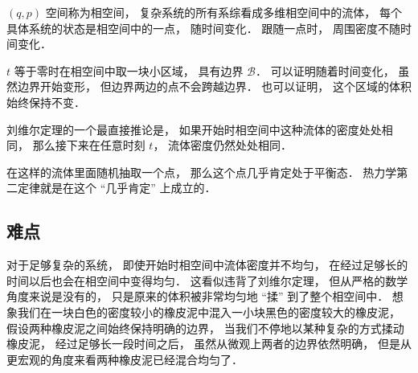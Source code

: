 
\begin{issues}
\issueDraft
\end{issues}

$(q, p)$ 空间称为相空间， 复杂系统的所有系综看成多维相空间中的流体， 每个具体系统的状态是相空间中的一点， 随时间变化． 跟随一点时， 周围密度不随时间变化．

$t$ 等于零时在相空间中取一块小区域， 具有边界 $\mathcal B$． 可以证明随着时间变化， 虽然边界开始变形， 但边界两边的点不会跨越边界． 也可以证明， 这个区域的体积始终保持不变．

刘维尔定理的一个最直接推论是， 如果开始时相空间中这种流体的密度处处相同， 那么接下来在任意时刻 $t$， 流体密度仍然处处相同．

在这样的流体里面随机抽取一个点， 那么这个点几乎肯定处于平衡态． 热力学第二定律就是在这个 “几乎肯定” 上成立的．

\subsection{难点}
对于足够复杂的系统， 即使开始时相空间中流体密度并不均匀， 在经过足够长的时间以后也会在相空间中变得均匀． 这看似违背了刘维尔定理， 但从严格的数学角度来说是没有的， 只是原来的体积被非常均匀地 “揉” 到了整个相空间中． 想象我们在一块白色的密度较小的橡皮泥中混入一小块黑色的密度较大的橡皮泥， 假设两种橡皮泥之间始终保持明确的边界， 当我们不停地以某种复杂的方式揉动橡皮泥， 经过足够长一段时间之后， 虽然从微观上两者的边界依然明确， 但是从更宏观的角度来看两种橡皮泥已经混合均匀了．
